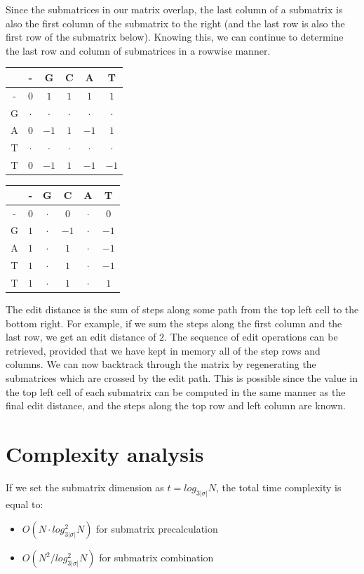 \documentclass[times, utf8, seminar, numeric]{fer}
\begin{document}
Since the submatrices in our matrix overlap, the last column of a submatrix is also the first column of the submatrix to the right (and the last row is also the first row of the submatrix below). Knowing this, we can continue to determine the last row and column of submatrices in a rowwise manner.

\begin{table}[H]
\centering
\begin{tabular}{c|ccccc}
  & - & G & C & A & T\\
\hline
- & $0$ & $1$ & $1$ & $1$ & $1$ \\
G & $\cdot$ & $\cdot$ & $\cdot$ & $\cdot$ & $\cdot$ \\
A & $0$ & $-1$ & $1$ & $-1$ & $1$ \\
T & $\cdot$ & $\cdot$ & $\cdot$ & $\cdot$ & $\cdot$ \\
T & $0$ & $-1$ & $1$ & $-1$ & $-1$ \\
\end{tabular}
\quad\quad
\begin{tabular}{c|ccccc}
  & - & G & C & A & T\\
\hline
- & $0$ & $\cdot$ & $0$ & $\cdot$ & $0$ \\
G & $1$ & $\cdot$ & $-1$ & $\cdot$ & $-1$ \\
A & $1$ & $\cdot$ & $1$ & $\cdot$ & $-1$ \\
T & $1$ & $\cdot$ & $1$ & $\cdot$ & $-1$ \\
T & $1$ & $\cdot$ & $1$ & $\cdot$ & $1$ \\
\end{tabular}
\end{table}

The edit distance is the sum of steps along some path from the top left cell to the bottom right. For example, if we sum the steps along the first column and the last row, we get an edit distance of $2$. The sequence of edit operations can be retrieved, provided that we have kept in memory all of the step rows and columns. We can now backtrack through the matrix by regenerating the submatrices which are crossed by the edit path. This is possible since the value in the top left cell of each submatrix can be computed in the same manner as the final edit distance, and the steps along the top row and left column are known.

\section{Complexity analysis}
If we set the submatrix dimension as $t = log_{3|\sigma|}N$, the total time complexity is equal to:
\begin{itemize}
\item $O(N \cdot log_{3|\sigma|}^2N)$ for submatrix precalculation
\item $O(N^2 / log_{3|\sigma|}^2N)$ for submatrix combination
\end{itemize}
\end{document}
